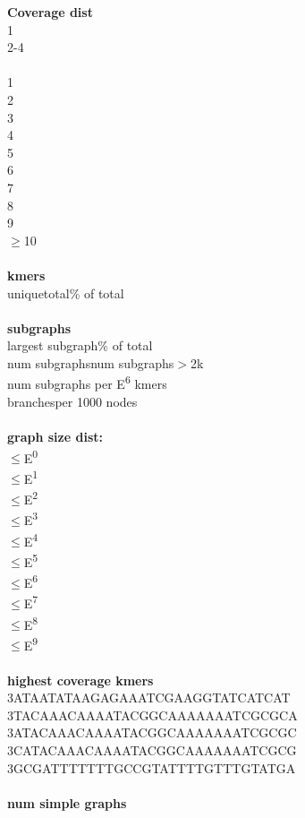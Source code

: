 \documentclass[a4paper, 12pt, oneside]{article}
\begin{document}
\textbf{Coverage dist}\\
1\\
2-4\\
\\
1\\
2\\
3\\
4\\
5\\
6\\
7\\
8\\
9\\
\(\geq\)10   \\
\\
\textbf{kmers}\\
unique\quad\quad total\quad\quad \% of total\\
\\
\textbf{subgraphs}\\
largest subgraph\quad\quad  \% of total\\
num subgraphs\quad num subgraphs\(>\)2k\\
num subgraphs per E\textsuperscript{6} kmers\\
branches\quad\quad per 1000 nodes\\
\\
\textbf{graph size dist:}\\
\(\leq\)E\textsuperscript{0}\\
\(\leq\)E\textsuperscript{1}\\
\(\leq\)E\textsuperscript{2}\\
\(\leq\)E\textsuperscript{3}\\
\(\leq\)E\textsuperscript{4}\\
\(\leq\)E\textsuperscript{5}\\
\(\leq\)E\textsuperscript{6}\\
\(\leq\)E\textsuperscript{7}\\
\(\leq\)E\textsuperscript{8}\\
\(\leq\)E\textsuperscript{9}\\
\\
\textbf{highest coverage kmers}\\
3\quad ATAATATAAGAGAAATCGAAGGTATCATCAT\\
3\quad TACAAACAAAATACGGCAAAAAAATCGCGCA\\
3\quad ATACAAACAAAATACGGCAAAAAAATCGCGC\\
3\quad CATACAAACAAAATACGGCAAAAAAATCGCG\\
3\quad GCGATTTTTTTGCCGTATTTTGTTTGTATGA\\
\\
\textbf{num simple graphs}\\
\end{document}
